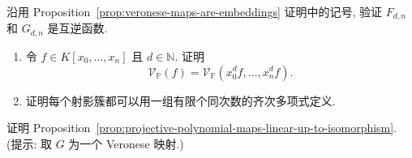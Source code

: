 \begin{BookExercises}
\begin{enumerate}
  \end{enumerate}
  \item\label{ex:veronese-piecewise-inverse} 沿用 Proposition~\ref{prop:veronese-maps-are-embeddings} 证明中的记号, 验证 $F_{d,n}$ 和 $G_{d,n}$ 是互逆函数.
  \item\label{ex:choose-projective-defining-polynomials-of-common-degree}
  \begin{enumerate}
    \item 令 $f\in K[x_{0},\ldots,x_{n}]$ 且 $d\in\mathbb{N}$. 证明
    \[
      \mathcal{V}_{\mathbb{P}}(f)=\mathcal{V}_{\mathbb{P}}(x_{0}^{d}f,\ldots,x_{n}^{d}f).
    \]
    \item 证明每个射影簇都可以用一组有限个同次数的齐次多项式定义.
  \end{enumerate}
  \item\label{ex:linearize-projective-polynomial-map-by-veronese} 证明 Proposition~\ref{prop:projective-polynomial-maps-linear-up-to-isomorphism}. (提示: 取 $G$ 为一个 Veronese 映射.)
\end{BookExercises}
